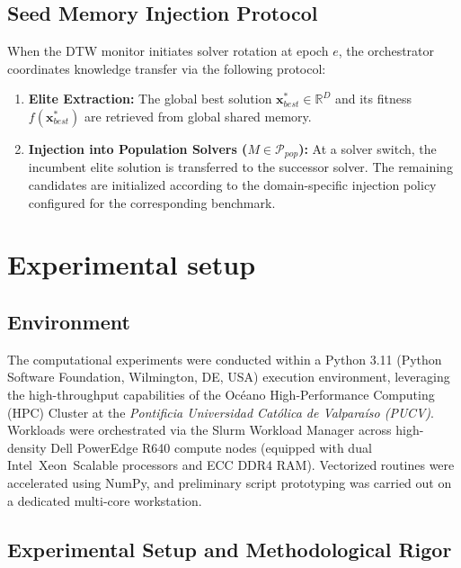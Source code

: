 \documentclass[review]{elsarticle}
\begin{document}
\subsection{Seed Memory Injection Protocol}

When the DTW monitor initiates solver rotation at epoch $e$, the orchestrator coordinates knowledge transfer via the following protocol:
\begin{enumerate}
    \item \textbf{Elite Extraction:} The global best solution $\mathbf{x}_{best}^* \in \mathbb{R}^D$ and its fitness $f(\mathbf{x}_{best}^*)$ are retrieved from global shared memory.
    \item \textbf{Injection into Population Solvers ($M \in \mathcal{P}_{pop}$):} At a solver switch, the incumbent elite solution is transferred to the successor solver. The remaining candidates are initialized according to the domain-specific injection policy configured for the corresponding benchmark.
\end{enumerate}


\section{Experimental setup}
\label{sec:experimental_setup_overview}


\subsection{Environment}
\label{sec:computational_environment}

The computational experiments were conducted within a Python 3.11 (Python Software Foundation, Wilmington, DE, USA) execution environment, leveraging the high-throughput capabilities of the Océano High-Performance Computing (HPC) Cluster at the \textit{Pontificia Universidad Católica de Valparaíso (PUCV)}. Workloads were orchestrated via the Slurm Workload Manager across high-density Dell PowerEdge R640 compute nodes (equipped with dual Intel\textregistered\ Xeon\textregistered\ Scalable processors and ECC DDR4 RAM). Vectorized routines were accelerated using NumPy, and preliminary script prototyping was carried out on a dedicated multi-core workstation.
\subsection{Experimental Setup and Methodological Rigor}
\label{sec:experimental_setup}
\end{document}

